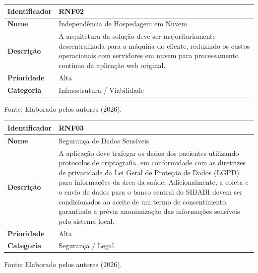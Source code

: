 \begin{quadro}[H]
\centering
\caption{Especificação do Requisito Não Funcional 02 (RNF02) - Otimização de Custos}
\label{quadro:rnf02}
\begin{tabular}{|l|p{11cm}|}
\hline
\textbf{Identificador} & \textbf{RNF02} \\ \hline
\textbf{Nome} & Independência de Hospedagem em Nuvem \\ \hline
\textbf{Descrição} & A arquitetura da solução deve ser majoritariamente descentralizada para a máquina do cliente, reduzindo os custos operacionais com servidores em nuvem para processamento contínuo da aplicação web original. \\ \hline
\textbf{Prioridade} & Alta \\ \hline
\textbf{Categoria} & Infraestrutura / Viabilidade \\ \hline
\end{tabular}
\centerline{\footnotesize Fonte: Elaborado pelos autores (2026).}
\end{quadro}

\begin{quadro}[H]
\centering
\caption{Especificação do Requisito Não Funcional 03 (RNF03) - Segurança e LGPD}
\label{quadro:rnf03}
\begin{tabular}{|l|p{11cm}|}
\hline
\textbf{Identificador} & \textbf{RNF03} \\ \hline
\textbf{Nome} & Segurança de Dados Sensíveis \\ \hline
\textbf{Descrição} & A aplicação deve trafegar os dados dos pacientes utilizando protocolos de criptografia, em conformidade com as diretrizes de privacidade da Lei Geral de Proteção de Dados (LGPD) para informações da área da saúde. Adicionalmente, a coleta e o envio de dados para o banco central do SIDABI devem ser condicionados ao aceite de um termo de consentimento, garantindo a prévia anonimização das informações sensíveis pelo sistema local. \\ \hline
\textbf{Prioridade} & Alta \\ \hline
\textbf{Categoria} & Segurança / Legal \\ \hline
\end{tabular}
\centerline{\footnotesize Fonte: Elaborado pelos autores (2026).}
\end{quadro}

